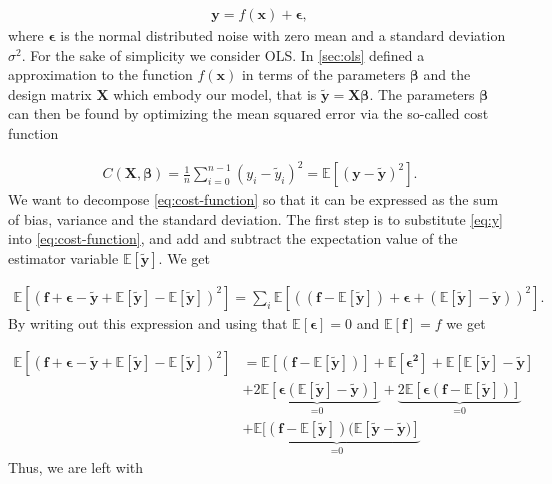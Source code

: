 \begin{align}
    \mathbf{y}=f(\mathbf{x})+\boldsymbol{\epsilon}, 
    \label{eq:y}
\end{align} where \ensuremath{\boldsymbol{\epsilon}} is the normal distributed noise with zero mean and a standard deviation \ensuremath{\sigma^2}. For the sake of simplicity we consider OLS. In \cref{sec:ols} defined a approximation to the function \ensuremath{f(\mathbf{x})} in terms of the parameters \ensuremath{\boldsymbol{\beta}} and the design matrix \ensuremath{\mathbf{X}} which embody our model, that is \ensuremath{\mathbf{\tilde{y}}=\mathbf{X}\boldsymbol{\beta}}. The parameters \ensuremath{\boldsymbol{\beta}} can then be found by optimizing the mean squared error via the so-called cost function

\begin{align}
    C(\mathbf{X}, \boldsymbol{\beta}) = \frac{1}{n}\sum_{i=0}^{n-1}(y_i-\tilde{y}_i)^2=\mathbb{E}\left[(\mathbf{y}-\mathbf{\tilde{y}})^2\right].
    \label{eq:cost-function}
\end{align} We want to decompose \cref{eq:cost-function} so that it can be expressed as the sum of bias, variance and the standard deviation. The first step is to substitute \cref{eq:y} into \cref{eq:cost-function}, and add and subtract the expectation value of the estimator variable \ensuremath{\mathbb{E}[\mathbf{\tilde{y}}]}. We get 

\begin{align}
    \mathbb{E}\left[(\mathbf{f}+\mathbf{\epsilon}-\mathbf{\tilde{y}}+\mathbb{E}[\mathbf{\tilde{y}}]-\mathbb{E}[\mathbf{\tilde{y}}])^2\right] = \sum_{i}\mathbb{E}\left[((\mathbf{f}-\mathbb{E}[\mathbf{\tilde{y}}])+\mathbf{\epsilon}+(\mathbb{E}[\mathbf{\tilde{y}}]-\mathbf{\tilde{y}}))^2\right]. 
\end{align} By writing out this expression and using that \ensuremath{\mathbb{E}[\mathbf{\epsilon}]=0} and \ensuremath{\mathbb{E}[\mathbf{f}]=f} we get

\begin{align*}
    \mathbb{E}\left[(\mathbf{f}+\mathbf{\epsilon}-\mathbf{\tilde{y}}+\mathbb{E}[\mathbf{\tilde{y}}]-\mathbb{E}[\mathbf{\tilde{y}}])^2\right] &= 
    \mathbb{E}[(\mathbf{f}-\mathbb{E}[\mathbf{\tilde{y}}])]+\mathbb{E}[\mathbf{\epsilon^2}]+\mathbb{E}[\mathbb{E}[\mathbf{\tilde{y}}]-\mathbf{\tilde{y}}]\\&+\underbrace{2\mathbb{E}[\boldsymbol{\epsilon}(\mathbb{E}[\mathbf{\tilde{y}}]-\mathbf{\tilde{y}})]}_{\text{=0}}+\underbrace{2\mathbb{E}[\boldsymbol{\epsilon}(\mathbf{f}-\mathbb{E}[\mathbf{\tilde{y}}])]}_{\text{=0}}\\&+\underbrace{\mathbb{E}[(\mathbf{f}-\mathbb{E}[\mathbf{\tilde{y}}])(\mathbb{E}[\mathbf{\tilde{y}}-\mathbf{\tilde{y}})]}_{\text{=0}}
\end{align*} Thus, we are left with 

